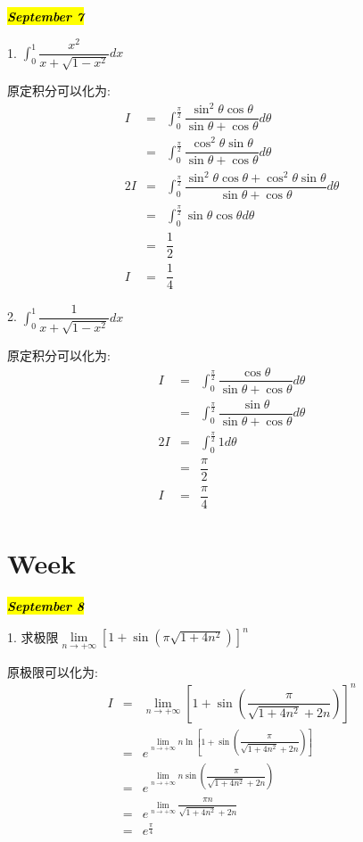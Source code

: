 \hl{\textbf{\textit{September 7}}}

1. $\int_{0}^{1}\dfrac{x^2}{x+\sqrt{1-x^2}}dx$
\begin{solution}

	原定积分可以化为:  
	\begin{eqnarray*}
		I&=&\int_{0}^{\frac{\pi}{2}}\dfrac{\sin^2\theta\cos\theta}{\sin\theta+\cos\theta}d\theta\\
		&=&\int_{0}^{\frac{\pi}{2}}\dfrac{\cos^2\theta\sin\theta}{\sin\theta+\cos\theta}d\theta\\
		2I&=&\int_{0}^{\frac{\pi}{2}}\dfrac{\sin^2\theta\cos\theta+\cos^2\theta\sin\theta}{\sin\theta+\cos\theta}d\theta\\
		&=&\int_{0}^{\frac{\pi}{2}}\sin\theta\cos\theta d\theta\\
		&=&\dfrac{1}{2}\\
		I&=&\dfrac{1}{4}
	\end{eqnarray*}
\end{solution}

2. $\int_{0}^{1}\dfrac{1}{x+\sqrt{1-x^2}}dx$
\begin{solution}

	原定积分可以化为:  
	\begin{eqnarray*}
		I&=&\int_{0}^{\frac{\pi}{2}}\dfrac{\cos\theta}{\sin\theta+\cos\theta}d\theta\\
		&=&\int_{0}^{\frac{\pi}{2}}\dfrac{\sin\theta}{\sin\theta+\cos\theta}d\theta\\
		2I&=&\int_{0}^{\frac{\pi}{2}}1d\theta\\
		&=&\dfrac{\pi}{2}\\
		I&=&\dfrac{\pi}{4}
	\end{eqnarray*}
\end{solution}

\section{Week }
\hl{\textbf{\textit{September 8}}}

1. 求极限$\lim\limits_{n\rightarrow+\infty}\left[1+\sin\left(\pi\sqrt{1+4n^2} \right) \right]^n$
\begin{solution}

	原极限可以化为:  
	\begin{eqnarray*}
		I&=&\lim\limits_{n\rightarrow+\infty}\left[1+\sin\left(\dfrac{\pi}{\sqrt{1+4n^2}+2n}\right) \right]^n\\
		&=&e^{\lim\limits_{n\rightarrow+\infty}n\ln\left[1+\sin\left(\dfrac{\pi}{\sqrt{1+4n^2}+2n}\right)\right]}\\
		&=&e^{\lim\limits_{n\rightarrow+\infty}n\sin\left(\dfrac{\pi}{\sqrt{1+4n^2}+2n}\right)}\\
		&=&e^{\lim\limits_{n\rightarrow+\infty}\dfrac{\pi n}{\sqrt{1+4n^2}+2n}}\\
		&=&e^{\frac{\pi}{4}}
	\end{eqnarray*}
\end{solution}

